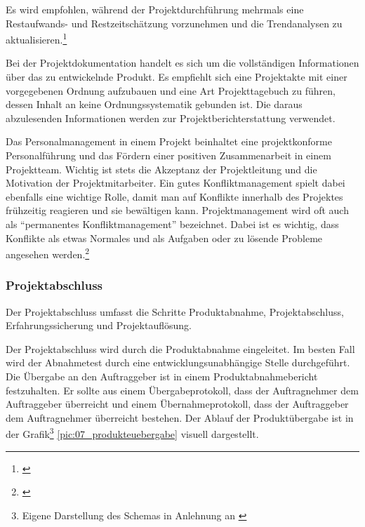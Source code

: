 Es wird empfohlen, während der Projektdurchführung mehrmals eine Restaufwands-
und Restzeitschätzung vorzunehmen und die Trendanalysen zu aktualisieren.\footnote{\citealp*[Vgl.][S. 16]{burghardt2007einfuehrung}}

Bei der Projektdokumentation handelt es sich um die vollständigen Informationen
über das zu entwickelnde Produkt. Es empfiehlt sich eine Projektakte mit einer
vorgegebenen Ordnung aufzubauen und eine Art Projekttagebuch zu führen, dessen
Inhalt an keine Ordnungssystematik gebunden ist. Die daraus abzulesenden
Informationen werden zur Projektberichterstattung verwendet.

Das Personalmanagement in einem Projekt beinhaltet eine projektkonforme
Personalführung und das Fördern einer positiven Zusammenarbeit in einem
Projektteam. Wichtig ist stets die Akzeptanz der Projektleitung und die 
Motivation der Projektmitarbeiter. Ein gutes Konfliktmanagement spielt
dabei ebenfalls eine wichtige Rolle, damit man auf Konflikte innerhalb des
Projektes frühzeitig reagieren und sie bewältigen kann. Projektmanagement
wird oft auch als ``permanentes Konfliktmanagement'' bezeichnet. Dabei ist es
wichtig, dass Konflikte als etwas Normales und als Aufgaben oder zu lösende 
Probleme angesehen werden.\footnote{\citealp*[S. 119]{kessler2004projektmanagement}}

\subsubsection{Projektabschluss}
Der Projektabschluss umfasst die Schritte Produktabnahme, Projektabschluss,
Erfahrungssicherung und Projektauflösung.

Der Projektabschluss wird durch die Produktabnahme eingeleitet. Im besten Fall
wird der Abnahmetest durch eine entwicklungsunabhängige Stelle durchgeführt.
Die Übergabe an den Auftraggeber ist in einem Produktabnahmebericht festzuhalten.
Er sollte aus einem Übergabeprotokoll, dass der Auftragnehmer dem Auftraggeber
überreicht und einem Übernahmeprotokoll, dass der Auftraggeber dem Auftragnehmer
überreicht bestehen. Der Ablauf der Produktübergabe ist in der Grafik\footnote{Eigene Darstellung des Schemas in Anlehnung an \citealp*[S. 262]{burghardt2007einfuehrung}}
\ref{pic:07_produkteuebergabe} visuell dargestellt.

